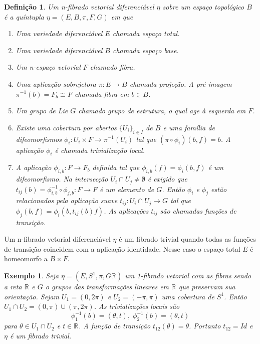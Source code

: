 \documentclass[12pt]{book}
\newtheorem{definicao}[teorema]{Definição}
\newtheorem{exemplo}[teorema]{Exemplo}
\newcommand{\circulo}{S^{1}}
\newcommand{\real}[1]{\mathbb{R}^{#1}}
\newcommand{\reta}{\real{}}
\begin{document}
	\begin{definicao}
		Um n-fibrado vetorial diferenciável $\eta$ sobre um espaço topológico $B$ é a quíntupla $\eta = (E, B, \pi, F, G)$ em que
		
		\begin{enumerate}
			\item Uma variedade diferenciável $E$ chamada espaço total.
			
			\item Uma variedade diferenciável $B$ chamada espaço base.
			
			\item Um n-espaço vetorial $F$ chamado fibra.
			
			\item Uma aplicação sobrejetora $\pi: E\to B$ chamada projeção. A pré-imagem $\pi^{-1}(b) = F_{b} \cong F$ chamada fibra em $b\in B$. 
			
			\item Um grupo de Lie $G$ chamado grupo de estrutura, o qual age à esquerda em $F$.
			
			\item Existe uma cobertura por abertos $\{U_{i}\}_{i\in I}$ de $B$ e uma família de difeomorfismos $\phi_{i}: U_{i}\times F\to \pi^{-1}(U_{i})$ tal que $(\pi\circ \phi_{i})(b,f) = b$. A aplicação $\phi_{i}$ é chamada trivialização local.
			
			\item A aplicação $\phi_{i,b}: F\to F_{b}$ definida tal que $\phi_{i,b}(f) = \phi_{i}(b,f)$ é um difeomorfismo. Na intersecção $U_{i}\cap U_{j}\neq \emptyset$ é exigido que $t_{ij}(b)=\phi_{i,b}^{-1}\circ \phi_{j,b}:F\to F$ é um elemento de $G$. Então $\phi_{i}$ e $\phi_{j}$ estão relacionados pela aplicação suave $t_{ij}: U_{i}\cap U_{j}\to G$ tal que $\phi_{j}(b, f) = \phi_{i}(b, t_{ij}(b)f)$. As aplicações $t_{ij}$ são chamadas funções de transição.
		\end{enumerate}
		
	\end{definicao}
	
	Um n-fibrado vetorial diferenciável $\eta$ é um fibrado trivial quando todas as funções de transição coincidem com a aplicação identidade. Nesse caso o espaço total $E$ é homeomorfo a $B\times F$.
	
	\begin{exemplo}\label{exemplo_fibrado_circulo}
		Seja $\eta=(E, \circulo,\pi, G \reta)$ um 1-fibrado vetorial com as fibras sendo a reta $\reta$ e $G$ o grupos das transformações lineares em $\reta$ que preservam sua orientação. Sejam $U_{1} = (0,2\pi)$ e $U_{2} = (-\pi,\pi)$ uma cobertura de $\circulo$. Então $U_{1}\cap U_{2} =(0,\pi)\cup(\pi,2\pi)$. As trivializações locais são 
		$$
		\phi^{-1}_{1}(b) = (\theta, t),\; 		\phi^{-1}_{2}(b) = (\theta, t)
		$$
		para $\theta\in U_{1}\cap U_{2}$ e $t\in \reta$. A função de transição $t_{12}(\theta) = \theta$. Portanto $t_{12}=Id$ e $\eta$ é um fibrado trivial.
	\end{exemplo}
	
\end{document}
